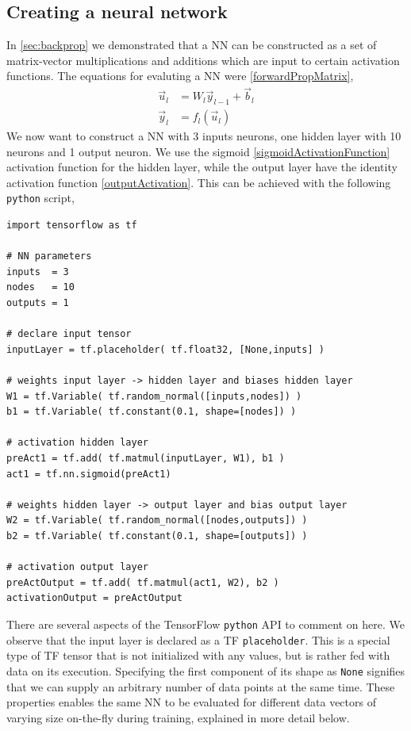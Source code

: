 \documentclass[twoside,english]{uiofysmaster}
\begin{document}
\subsection{Creating a neural network} \label{sec:TensorFlowCreatingNN}
In \autoref{sec:backprop} we demonstrated that a NN can be constructed 
as a set of matrix-vector multiplications and additions which are input to certain activation functions. 
The equations for evaluting a NN were \eqref{forwardPropMatrix},
\begin{equation}
 \begin{aligned}
  \vec{u}_l &= W_l\vec{y}_{l-1} + \vec{b}_l \\
  \vec{y}_l &= f_l(\vec{u}_l)
  \label{forwardPropMatrix}
 \end{aligned}
\end{equation}
We now want to construct a NN with 3 inputs neurons, one hidden layer with 10 neurons and 1 output neuron. 
We use the sigmoid \eqref{sigmoidActivationFunction} activation function for the hidden layer, while 
the output layer have the identity activation function \eqref{outputActivation}.
This can be achieved with the following \texttt{python} script,
\begin{verbatim}
import tensorflow as tf

# NN parameters
inputs 	= 3
nodes 	= 10
outputs = 1

# declare input tensor
inputLayer = tf.placeholder( tf.float32, [None,inputs] )

# weights input layer -> hidden layer and biases hidden layer
W1 = tf.Variable( tf.random_normal([inputs,nodes]) )
b1 = tf.Variable( tf.constant(0.1, shape=[nodes]) )

# activation hidden layer
preAct1 = tf.add( tf.matmul(inputLayer, W1), b1 ) 
act1 = tf.nn.sigmoid(preAct1)

# weights hidden layer -> output layer and bias output layer
W2 = tf.Variable( tf.random_normal([nodes,outputs]) )
b2 = tf.Variable( tf.constant(0.1, shape=[outputs]) )

# activation output layer
preActOutput = tf.add( tf.matmul(act1, W2), b2 ) 
activationOutput = preActOutput
\end{verbatim}
There are several aspects of the TensorFlow \texttt{python} API to comment on here. 
We observe that the input layer is declared as a TF \texttt{placeholder}. This is a special
type of TF tensor that is not initialized with any values, but is rather fed with data on its execution.
Specifying the first component of its shape as \texttt{None} signifies that we can supply an arbitrary 
number of data points at the same time.
These properties enables the same NN to be evaluated for different data vectors of varying size on-the-fly during training, 
explained in more detail below. 
\end{document}
